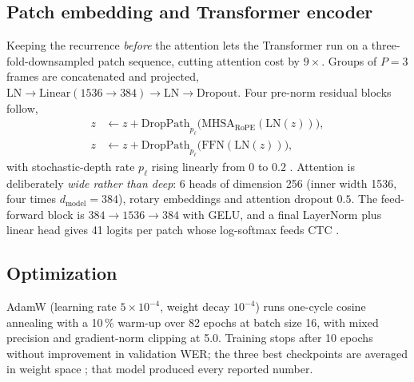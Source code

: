\documentclass[conference,a4paper,10pt]{IEEEtran}
\newcommand{\pct}{\,\%}
\begin{document}
\subsection{Patch embedding and Transformer encoder}
Keeping the recurrence \emph{before} the attention lets the Transformer
\cite{vaswani2017attention} run on a three-fold-downsampled patch sequence,
cutting attention cost by $9\times$. Groups of $P=3$ frames are concatenated and
projected, $\mathrm{LN}\rightarrow\mathrm{Linear}(1536\rightarrow384)
\rightarrow\mathrm{LN}\rightarrow\mathrm{Dropout}$. Four pre-norm residual blocks
\cite{xiong2020prenorm} follow,
\begin{align}
z &\leftarrow z+\mathrm{DropPath}_{p_\ell}\!\big(\mathrm{MHSA}_{\text{RoPE}}(\mathrm{LN}(z))\big),\label{eq:attn}\\
z &\leftarrow z+\mathrm{DropPath}_{p_\ell}\!\big(\mathrm{FFN}(\mathrm{LN}(z))\big),\label{eq:ffn}
\end{align}
with stochastic-depth rate $p_\ell$ rising linearly from $0$ to $0.2$
\cite{huang2016stochastic}. Attention is deliberately \emph{wide rather than
deep}: 6 heads of dimension 256 (inner width 1536, four times
$d_{\text{model}}=384$), rotary embeddings \cite{su2024roformer} and attention
dropout $0.5$. The feed-forward block is $384\rightarrow1536\rightarrow384$ with
GELU, and a final LayerNorm plus linear head gives 41 logits per patch whose
log-softmax feeds CTC \cite{graves2006ctc}.

\subsection{Optimization}
AdamW (learning rate $5\times10^{-4}$, weight decay $10^{-4}$) runs one-cycle
cosine annealing with a 10\pct{} warm-up over 82 epochs at batch size 16, with
mixed precision and gradient-norm clipping at 5.0. Training stops after 10
epochs without improvement in validation WER; the three best checkpoints are
averaged in weight space \cite{izmailov2018swa}; that model produced every
reported number.

\end{document}
